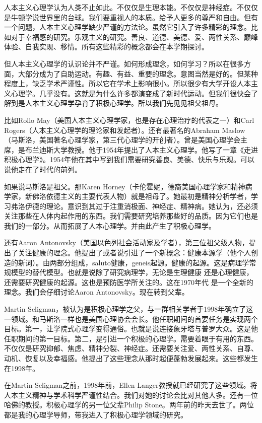 人本主义心理学认为人类不止如此。不仅仅是生理本能。不仅仅是神经症。不仅仅是牛顿学说世界里的台球。我们要重视人的本质。给予人更多的尊严和自由。但有一个问题，人本主义心理学缺少严谨的方法论。虽然它引入了许多精彩的理念。比如对于幸福感的研究。乐观主义的研究。善良、道德、美德、爱、两性关系、巅峰体验、自我实现、移情。所有这些精彩的概念都会在本学期探讨。

但人本主义心理学的认识论并不严谨。如何形成理念，如何学习？所以在很多方面，大部分成为了自助运动。有趣、有益、重要的理念。意图当然是好的。但某种程度上，缺乏学术严谨性。所以它在学术上影响很小。所以很少有大学开设人本主义心理学。几乎没有。这就是为什么许多都演变成了新时代运动。但我们很快会了解到是人本主义心理学孕育了积极心理学。所以我们先见见祖父祖母。

比如Rollo May（美国人本主义心理学家，也是存在心理治疗的代表之一）和Carl Rogers（人本主义心理学的理论家和发起者）。还有最著名的Abraham Maslow（马斯洛，美国著名心理学家，第三代心理学的开创者）。曾是美国心理学会主席，是布兰迪斯大学教授。他于1954年提出了人本主义心理学。他写了一章《走进积极心理学》。1954年他在其中写到我们需要研究善良、美德、快乐与乐观。可以说他走在了时代的前列。

如果说马斯洛是祖父。那Karen Horney（卡伦霍妮，德裔美国心理学家和精神病学家，新佛洛依德主义的主要代表人物）就是祖母了。她最初是精神分析学者，学习弗洛伊德的理论。意识到其过于注重消极面、神经症、精神病。她认为，还必须关注那些在人体内起作用的东西。我们需要研究培养那些好的品质。因为它们也是我们的一部分。从而拓展了人本心理学。并由此产生了积极心理学。

还有Aaron Antonovsky（美国以色列社会活动家及学者），第三位祖父级人物，提出了关注健康的理念。他提出了或者说引进了一个新概念：健康本源学（他个人创造的新词）。由两部分组成，saluto健康，geneis起源。健康的起源。这是病理学常规模型的替代模型。也就是说除了研究病理学，无论是生理健康 还是心理健康，还需要研究健康的起源。这也是预防医学所关注的。这在1970年代 是一个全新的理念。我们会仔细讨论Aaron Antonovsky。现在转到父辈。

Martin Seligman，被认为是积极心理学之父，与一群相关学者于1998年确立了这一领域。和马斯洛一样也是美国心理协会会长。他任职期间的首要任务是实现两个目标。第一，让学院式心理学变得通俗。也就是说连接象牙塔与普罗大众。这是他任职期间的第一目标。第二，是引进一个积极的心理学。需要着眼于有用的东西。不仅仅是研究抑郁、焦虑、精神分裂、神经症。还需要关注爱、两性关系、自尊、动机、恢复以及幸福感。他提出了这些理念从那时起便蓬勃发展起来。这些都发生在1998年。

在Martin Seligman之前，1998年前，Ellen Langer教授就已经研究了这些领域。将人本主义精神与学术科学严谨性结合。我们对她的讨论会比对其他人多。还有一位哈佛的教授。积极心理学的另一位父辈Philip Stone。两年前的昨天去世了。两位都是我的心理学导师，带我进入了积极心理学领域的研究。

